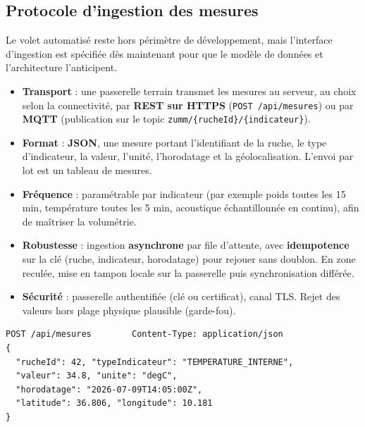 \subsection{Protocole d'ingestion des mesures}
Le volet automatisé reste hors périmètre de développement, mais l'interface
d'ingestion est spécifiée dès maintenant pour que le modèle de données et
l'architecture l'anticipent.
\begin{itemize}
  \item \textbf{Transport} : une passerelle terrain transmet les mesures au
        serveur, au choix selon la connectivité, par \textbf{REST sur HTTPS}
        (\texttt{POST /api/mesures}) ou par \textbf{MQTT} (publication sur le
        topic \texttt{zumm/\{rucheId\}/\{indicateur\}}).
  \item \textbf{Format} : \textbf{JSON}, une mesure portant l'identifiant de la
        ruche, le type d'indicateur, la valeur, l'unité, l'horodatage et la
        géolocalisation. L'envoi par lot est un tableau de mesures.
  \item \textbf{Fréquence} : paramétrable par indicateur (par exemple poids
        toutes les 15 min, température toutes les 5 min, acoustique échantillonnée
        en continu), afin de maîtriser la volumétrie.
  \item \textbf{Robustesse} : ingestion \textbf{asynchrone} par file d'attente, avec
        \textbf{idempotence} sur la clé (ruche, indicateur, horodatage) pour
        rejouer sans doublon. En zone reculée, mise en tampon locale sur la
        passerelle puis synchronisation différée.
  \item \textbf{Sécurité} : passerelle authentifiée (clé ou certificat), canal
        TLS. Rejet des valeurs hors plage physique plausible (garde-fou).
\end{itemize}
\begin{verbatim}
POST /api/mesures        Content-Type: application/json
{
  "rucheId": 42, "typeIndicateur": "TEMPERATURE_INTERNE",
  "valeur": 34.8, "unite": "degC",
  "horodatage": "2026-07-09T14:05:00Z",
  "latitude": 36.806, "longitude": 10.181
}
\end{verbatim}

